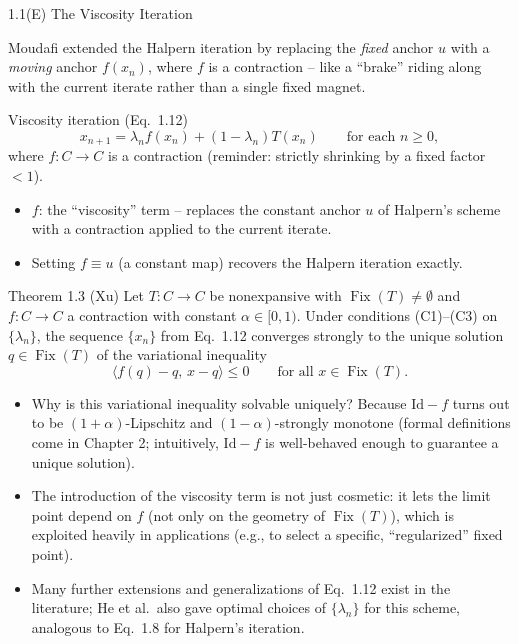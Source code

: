 \documentclass[aspectratio=169,10pt]{beamer}
\newcommand{\Fix}{\operatorname{Fix}}
\newcommand{\Id}{\mathrm{Id}}
\begin{document}
\begin{frame}[allowframebreaks]{1.1(E) The Viscosity Iteration}

Moudafi extended the Halpern iteration by replacing the \emph{fixed}
anchor $u$ with a \emph{moving} anchor $f(x_n)$, where $f$ is a
contraction -- like a ``brake'' riding along with the current iterate
rather than a single fixed magnet.

\begin{block}{Viscosity iteration (Eq.\ 1.12)}
\[
  x_{n+1} = \lambda_n f(x_n) + (1-\lambda_n)T(x_n) \qquad \text{for each } n\ge 0,
\]
where $f:C\to C$ is a contraction (reminder: strictly shrinking by a fixed
factor $<1$).
\begin{itemize}
  \item $f$: the ``viscosity'' term -- replaces the constant anchor $u$ of
    Halpern's scheme with a contraction applied to the current iterate.
  \item Setting $f\equiv u$ (a constant map) recovers the Halpern
    iteration exactly.
\end{itemize}
\end{block}

\begin{block}{Theorem 1.3 (Xu)}
Let $T:C\to C$ be nonexpansive with $\Fix(T)\ne\emptyset$ and $f:C\to C$ a
contraction with constant $\alpha\in[0,1)$. Under conditions (C1)--(C3) on
$\{\lambda_n\}$, the sequence $\{x_n\}$ from Eq.\ 1.12 converges strongly
to the unique solution $q\in\Fix(T)$ of the variational inequality
\[
  \langle f(q)-q,\, x-q\rangle \le 0 \qquad \text{for all } x\in\Fix(T).
\]
\end{block}

\framebreak

\begin{itemize}
  \item Why is this variational inequality solvable uniquely? Because
    $\Id-f$ turns out to be $(1+\alpha)$-Lipschitz and
    $(1-\alpha)$-strongly monotone (formal definitions come in Chapter 2;
    intuitively, $\Id-f$ is well-behaved enough to guarantee a unique
    solution).
  \item The introduction of the viscosity term is not just cosmetic: it
    lets the limit point depend on $f$ (not only on the geometry of
    $\Fix(T)$), which is exploited heavily in applications (e.g., to select
    a specific, ``regularized'' fixed point).
  \item Many further extensions and generalizations of Eq.\ 1.12 exist in
    the literature; He et al.\ also gave optimal choices of $\{\lambda_n\}$
    for this scheme, analogous to Eq.\ 1.8 for Halpern's iteration.
\end{itemize}

\end{frame}
\end{document}
